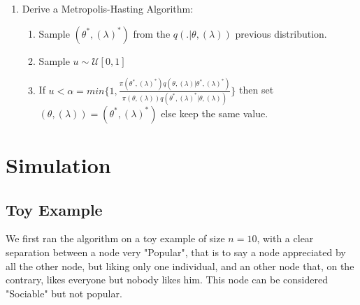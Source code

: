 \documentclass[12pt]{ociamthesis}  %
\begin{document}
\begin{enumerate}
	\item Derive a Metropolis-Hasting Algorithm:
	\begin{enumerate}
	\item Sample $(\theta^{*}, (\lambda)^{*})$ from the $q(.|\theta, (\lambda))$ previous distribution.
	\item Sample $u \sim \mathcal{U}[0,1]$
	\item If $u < \alpha = min\{ 1, \frac{\pi(\theta^{*}, (\lambda)^{*})q(\theta, (\lambda) |\theta^{*}, (\lambda)^{*})}{\pi(\theta, (\lambda))q(\theta^{*}, (\lambda)^{*} |\theta, (\lambda))}   \}$ then set $(\theta, (\lambda)) = (\theta^{*}, (\lambda)^{*})$ else keep the same value.
	\end{enumerate}
	\end{enumerate}
	
	\section{Simulation}
	
	\subsection{Toy Example}
	
	We first ran the algorithm on a toy example of size $n = 10$, with a clear separation between a node very "Popular", that is to say a node appreciated by all the other node, but liking only one individual, and an other node that, on the contrary, likes everyone but nobody likes him. This node can be considered "Sociable" but not popular.
	
\end{document}
